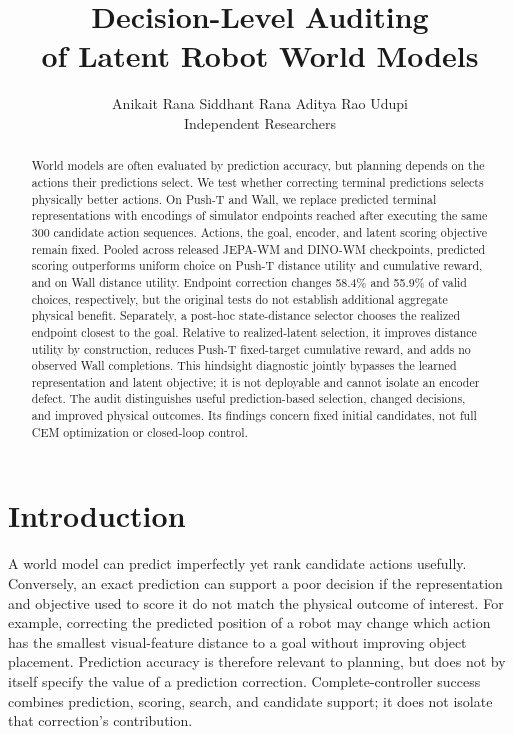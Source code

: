 \documentclass{article}
\title{Decision-Level Auditing\\of Latent Robot World Models}
\author{Anikait Rana \qquad
Siddhant Rana \qquad Aditya Rao Udupi\\
Independent Researchers}
\begin{document}
\maketitle

\begin{abstract}
World models are often evaluated by prediction accuracy, but planning depends
on the actions their predictions select. We test whether correcting terminal
predictions selects physically better actions. On Push-T and Wall, we replace
predicted terminal representations with encodings of simulator endpoints reached
after executing the same 300 candidate action sequences. Actions, the goal,
encoder, and latent scoring objective remain fixed. Pooled across released
JEPA-WM and DINO-WM checkpoints, predicted scoring outperforms uniform choice on Push-T
distance utility and cumulative reward, and on Wall distance utility.
Endpoint correction changes 58.4\% and 55.9\% of valid choices, respectively,
but the original tests do not establish additional aggregate physical benefit.
Separately, a post-hoc state-distance selector chooses the realized endpoint
closest to the goal. Relative to realized-latent selection, it improves distance
utility by construction, reduces Push-T fixed-target cumulative reward, and
adds no observed Wall completions.
This hindsight diagnostic jointly bypasses the learned representation and
latent objective; it is not deployable and cannot isolate an encoder defect.
The audit distinguishes useful prediction-based selection, changed decisions,
and improved physical outcomes. Its findings concern fixed initial candidates,
not full CEM optimization or closed-loop control.
\end{abstract}

\section{Introduction}

A world model can predict imperfectly yet rank candidate actions usefully.
Conversely, an exact prediction can support a poor decision if the representation
and objective used to score it do not match the physical outcome of interest.
For example, correcting the predicted position of a robot may change which
action has the smallest visual-feature distance to a goal without improving
object placement. Prediction accuracy is therefore relevant to planning, but
does not by itself specify the value of a prediction correction.
Complete-controller success combines prediction, scoring, search, and candidate
support; it does not isolate that correction's contribution.
\end{document}
